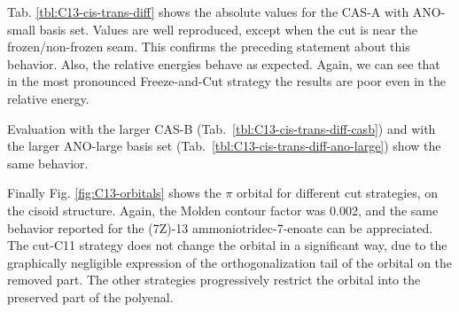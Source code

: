 

Tab. \ref{tbl:C13-cis-trans-diff} shows the absolute values for the CAS-A
with ANO-small basis set. Values are well reproduced, except when the cut is
near the frozen/non-frozen seam. This confirms the preceding statement
about this behavior. Also, the relative energies behave as expected. Again,
we can see that in the most pronounced Freeze-and-Cut strategy the results
are poor even in the relative energy.

Evaluation with the larger CAS-B (Tab.~\ref{tbl:C13-cis-trans-diff-casb})
and with the larger ANO-large basis set
(Tab.~\ref{tbl:C13-cis-trans-diff-ano-large}) show the same behavior.

Finally Fig. \ref{fig:C13-orbitals} shows the $\pi$ orbital for different cut
strategies, on the cisoid structure. Again, the Molden contour factor was
0.002, and the same behavior reported for the (7Z)-13 ammoniotridec-7-enoate
can be appreciated.  The cut-C11 strategy does not change the orbital in a
significant way, due to the graphically negligible expression of the
orthogonalization tail of the orbital on the removed part.  The other
strategies progressively restrict the orbital into the preserved part of
the polyenal.






\clearpage
